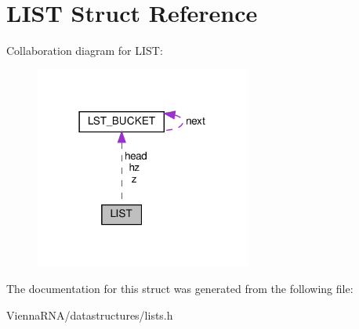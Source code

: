 \hypertarget{structLIST}{}\section{L\+I\+ST Struct Reference}
\label{structLIST}


Collaboration diagram for L\+I\+ST\+:
\nopagebreak
\begin{figure}[H]
\begin{center}
\leavevmode
\includegraphics[width=201pt]{structLIST__coll__graph}
\end{center}
\end{figure}


The documentation for this struct was generated from the following file\+:\begin{DoxyCompactItemize}
\item 
Vienna\+R\+N\+A/datastructures/lists.\+h\end{DoxyCompactItemize}
